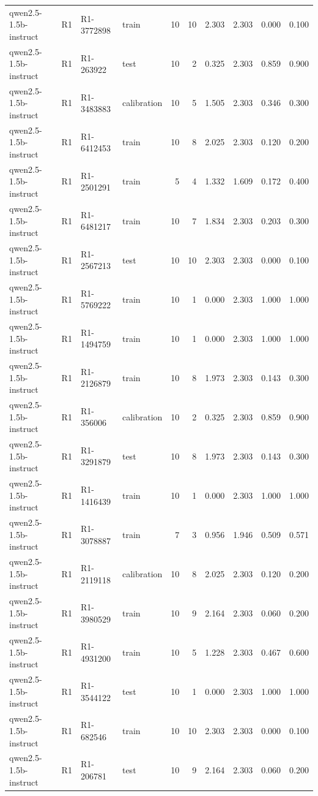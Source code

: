\begin{table}
\begin{tabular}{llllrrrrrr}
qwen2.5-1.5b-instruct & R1 & R1-3772898 & train & 10 & 10 & 2.303 & 2.303 & 0.000 & 0.100 \\
qwen2.5-1.5b-instruct & R1 & R1-263922 & test & 10 & 2 & 0.325 & 2.303 & 0.859 & 0.900 \\
qwen2.5-1.5b-instruct & R1 & R1-3483883 & calibration & 10 & 5 & 1.505 & 2.303 & 0.346 & 0.300 \\
qwen2.5-1.5b-instruct & R1 & R1-6412453 & train & 10 & 8 & 2.025 & 2.303 & 0.120 & 0.200 \\
qwen2.5-1.5b-instruct & R1 & R1-2501291 & train & 5 & 4 & 1.332 & 1.609 & 0.172 & 0.400 \\
qwen2.5-1.5b-instruct & R1 & R1-6481217 & train & 10 & 7 & 1.834 & 2.303 & 0.203 & 0.300 \\
qwen2.5-1.5b-instruct & R1 & R1-2567213 & test & 10 & 10 & 2.303 & 2.303 & 0.000 & 0.100 \\
qwen2.5-1.5b-instruct & R1 & R1-5769222 & train & 10 & 1 & 0.000 & 2.303 & 1.000 & 1.000 \\
qwen2.5-1.5b-instruct & R1 & R1-1494759 & train & 10 & 1 & 0.000 & 2.303 & 1.000 & 1.000 \\
qwen2.5-1.5b-instruct & R1 & R1-2126879 & train & 10 & 8 & 1.973 & 2.303 & 0.143 & 0.300 \\
qwen2.5-1.5b-instruct & R1 & R1-356006 & calibration & 10 & 2 & 0.325 & 2.303 & 0.859 & 0.900 \\
qwen2.5-1.5b-instruct & R1 & R1-3291879 & test & 10 & 8 & 1.973 & 2.303 & 0.143 & 0.300 \\
qwen2.5-1.5b-instruct & R1 & R1-1416439 & train & 10 & 1 & 0.000 & 2.303 & 1.000 & 1.000 \\
qwen2.5-1.5b-instruct & R1 & R1-3078887 & train & 7 & 3 & 0.956 & 1.946 & 0.509 & 0.571 \\
qwen2.5-1.5b-instruct & R1 & R1-2119118 & calibration & 10 & 8 & 2.025 & 2.303 & 0.120 & 0.200 \\
qwen2.5-1.5b-instruct & R1 & R1-3980529 & train & 10 & 9 & 2.164 & 2.303 & 0.060 & 0.200 \\
qwen2.5-1.5b-instruct & R1 & R1-4931200 & train & 10 & 5 & 1.228 & 2.303 & 0.467 & 0.600 \\
qwen2.5-1.5b-instruct & R1 & R1-3544122 & test & 10 & 1 & 0.000 & 2.303 & 1.000 & 1.000 \\
qwen2.5-1.5b-instruct & R1 & R1-682546 & train & 10 & 10 & 2.303 & 2.303 & 0.000 & 0.100 \\
qwen2.5-1.5b-instruct & R1 & R1-206781 & test & 10 & 9 & 2.164 & 2.303 & 0.060 & 0.200 \\

\end{tabular}
\end{table}
